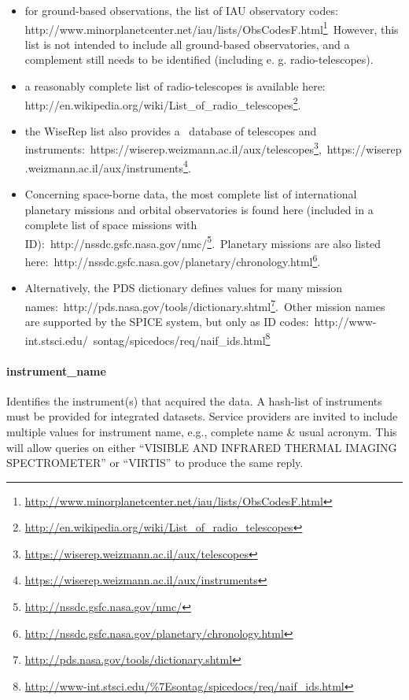 \documentclass[11pt,a4paper]{ivoa}
\begin{document}
\begin{itemize}
\item for ground-based observations, the list of IAU observatory codes: http://www.minorplanetcenter.net/iau/lists/ObsCodesF.html\footnote{\url{http://www.minorplanetcenter.net/iau/lists/ObsCodesF.html}} However, this list is not intended to include all ground-based observatories, and a complement still needs to be identified (including e. g. radio-telescopes). 
\item a reasonably complete list of radio-telescopes is available here: http://en.wikipedia.org/wiki/List\_of\_radio\_telescopes\footnote{\url{http://en.wikipedia.org/wiki/List_of_radio_telescopes}}.
\item the WiseRep list also provides a  database of telescopes and instruments: https://wiserep.weizmann.ac.il/aux/telescopes\footnote{\url{https://wiserep.weizmann.ac.il/aux/telescopes}}, https://wiserep.weizmann.ac.il/aux/instruments\footnote{\url{https://wiserep.weizmann.ac.il/aux/instruments}}. 
\item Concerning space-borne data, the most complete list of international planetary missions and orbital observatories is found here (included in a complete list of space missions with ID): http://nssdc.gsfc.nasa.gov/nmc/\footnote{\url{http://nssdc.gsfc.nasa.gov/nmc/}}. Planetary missions are also listed here: http://nssdc.gsfc.nasa.gov/planetary/chronology.html\footnote{\url{http://nssdc.gsfc.nasa.gov/planetary/chronology.html}}. 
\item Alternatively, the PDS dictionary defines values for many mission names: http://pds.nasa.gov/tools/dictionary.shtml\footnote{\url{http://pds.nasa.gov/tools/dictionary.shtml}}. Other mission names are supported by the SPICE system, but only as ID codes: http://www-int.stsci.edu/~sontag/spicedocs/req/naif\_ids.html\footnote{\url{http://www-int.stsci.edu/%7Esontag/spicedocs/req/naif_ids.html}}   
\end{itemize}

\paragraph{instrument\_name}

Identifies the instrument(s) that acquired the data. A hash-list of instruments must be provided for integrated datasets. Service providers are invited to include multiple values for instrument name, e.g., complete name \& usual acronym. This will allow queries on either ``VISIBLE AND INFRARED THERMAL IMAGING SPECTROMETER'' or ``VIRTIS'' to produce the same reply. 
\end{document}
